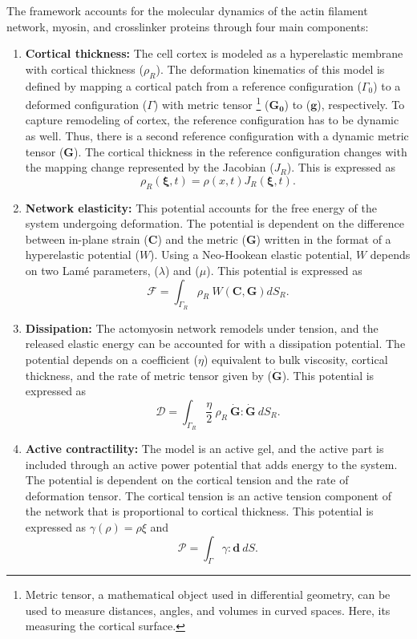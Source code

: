The framework accounts for the molecular dynamics of the actin filament network, myosin, and crosslinker proteins through four main components:

\begin{enumerate}
	\item \textbf{Cortical thickness:} The cell cortex is modeled as a hyperelastic membrane with cortical thickness ($\rho_R$). The deformation kinematics of this model is defined by mapping a cortical patch from a reference configuration ($\Gamma_0$) to a deformed configuration ($\Gamma$) with metric tensor \footnote{Metric  tensor, a mathematical object used in differential geometry, can be used to measure distances, angles, and volumes in curved spaces. Here, its measuring the cortical surface.} ($\mathbf{G_0}$) to ($\mathbf{g}$), respectively. To capture remodeling of cortex, the reference configuration has to be dynamic as well. Thus, there is a second reference configuration with a dynamic metric tensor ($\mathbf{G}$). The cortical thickness in the reference configuration changes with the mapping change represented by the Jacobian ($J_R$). This is expressed as 
	$$\rho_R(\mathbf{\xi}, t) = \rho(x,t)J_R(\mathbf{\xi},t).$$
	\item \textbf{Network elasticity:} This potential accounts for the free energy of the system undergoing deformation. The potential is dependent on the difference between in-plane strain ($\mathbf{C}$) and the metric ($\mathbf{G}$) written in the format of a hyperelastic potential ($W$). Using a Neo-Hookean elastic potential, $W$ depends on two Lamé parameters, ($\lambda$) and ($\mu$). This potential is expressed as $$\mathcal{F} = \int_{\Gamma_R} \rho_R \ W(\mathbf{C,G})dS_R.$$
	\item \textbf{Dissipation:} The actomyosin network remodels under tension, and the released elastic energy can be accounted for with a dissipation potential. The potential depends on a coefficient ($\eta$) equivalent to bulk viscosity, cortical thickness, and the rate of metric tensor given by ($\dot{\mathbf{G}}$). This potential is expressed as $$\mathcal{D} = \int_{\Gamma_R} \frac{\eta}{2}\ \rho_R \ \mathbf{\dot{G}}:\mathbf{\dot{G}} \ dS_R.$$
	\item \textbf{Active contractility:} The model is an active gel, and the active part is included through an active power potential that adds energy to the system. The potential is dependent on the cortical tension and the rate of deformation tensor. The cortical tension is an active tension component of the network that is proportional to cortical thickness. This potential is expressed as $\gamma(\rho) = \rho \xi$ and $$\mathcal{P} = \int_{\Gamma} \gamma : \mathbf{d} \ dS.$$
	
\end{enumerate}

